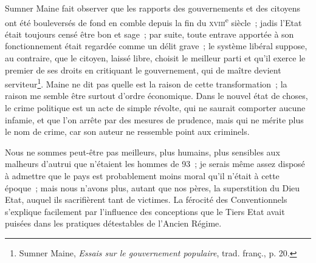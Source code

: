 \documentclass[french,twoside]{book} %
\begin{document}
Sumner Maine fait observer que les rapports des gouvernements et des citoyens ont été bouleversés de fond en comble depuis la fin du {\scshape xviii}\textsuperscript{e} siècle ; jadis l’Etat était toujours censé être bon et sage ; par suite, toute entrave apportée à son fonctionnement était regardée comme un délit grave ; le système libéral suppose, au contraire, que le citoyen, laissé libre, choisit le meilleur parti et qu’il exerce le premier de ses droits en critiquant le gouvernement, qui de maître devient serviteur\footnote{ \noindent Sumner Maine, \emph{Essais sur le gouvernement populaire}, trad. franç., p. 20.
 }. Maine ne dit pas quelle est la raison de cette transformation ; la raison me semble être surtout d’ordre économique. Dans le nouvel état de choses, le crime politique est un acte de simple révolte, qui ne saurait comporter aucune infamie, et que l’on arrête par des mesures de prudence, mais qui ne mérite plus le nom de crime, car son auteur ne ressemble point aux criminels.\par
Nous ne sommes peut-être pas meilleurs, plus humains, plus sensibles aux malheurs d’autrui que n’étaient les hommes de 93 ; je serais même assez disposé à admettre que le pays est probablement moins moral qu’il n’était à cette époque ; mais nous n’avons plus, autant que nos pères, la superstition du Dieu Etat, auquel ils sacrifièrent  tant de victimes. La férocité des Conventionnels s’explique facilement par l’influence des conceptions que le Tiers Etat avait puisées dans les pratiques détestables de l’Ancien Régime.
\end{document}
